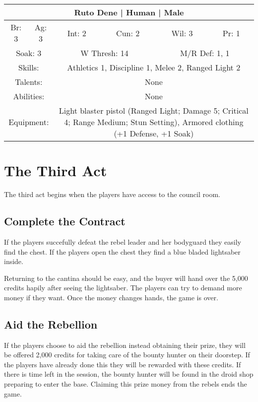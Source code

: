 \documentclass[letterpaper]{article}
\begin{document}
\begin{center}
\begin{tabular}{| c c c c c c |}
    \hline
    \multicolumn{6}{|c|}{Ruto Dene | Human | Male} \\
    \hline
    Br: 3 & Ag: 3 & Int: 2 & Cun: 2 & Wil: 3 & Pr: 1 \\[2mm]
    \multicolumn{2}{|c}{Soak: 3} & \multicolumn{2}{c}{W Thresh: 14} & \multicolumn{2}{c|}{M/R Def: 1, 1} \\
    \hline
    \multicolumn{2}{|c}{Skills:} & \multicolumn{4}{p{5cm}|}{Athletics 1, Discipline 1, Melee 2, Ranged Light 2} \\
    \multicolumn{2}{|c}{Talents:} & \multicolumn{4}{p{5cm}|}{None} \\
    \multicolumn{2}{|c}{Abilities:} & \multicolumn{4}{p{5cm}|}{None} \\
    \multicolumn{2}{|c}{Equipment:} & \multicolumn{4}{p{5cm}|}{Light blaster pistol (Ranged Light; Damage 5; Critical 4; Range Medium; Stun Setting), Armored clothing (+1 Defense, +1 Soak)} \\
    \hline
\end{tabular}
\end{center}

\section{The Third Act}

The third act begins when the players have access to the council room.

\subsection{Complete the Contract}

If the players succefully defeat the rebel leader and her bodyguard they easily find the chest. If the players open the chest they find a blue bladed lightsaber inside.

Returning to the cantina should be easy, and the buyer will hand over the 5,000 credits hapily after seeing the lightsaber. The players can try to demand more money if they want. Once the money changes hands, the game is over. 

\subsection{Aid the Rebellion}

If the players choose to aid the rebellion instead obtaining their prize, they will be offered 2,000 credits for taking care of the bounty hunter on their doorstep. If the players have already done this they will be rewarded with these credits. If there is time left in the session, the bounty hunter will be found in the droid shop preparing to enter the base. Claiming this prize money from the rebels ends the game.
\end{document}
